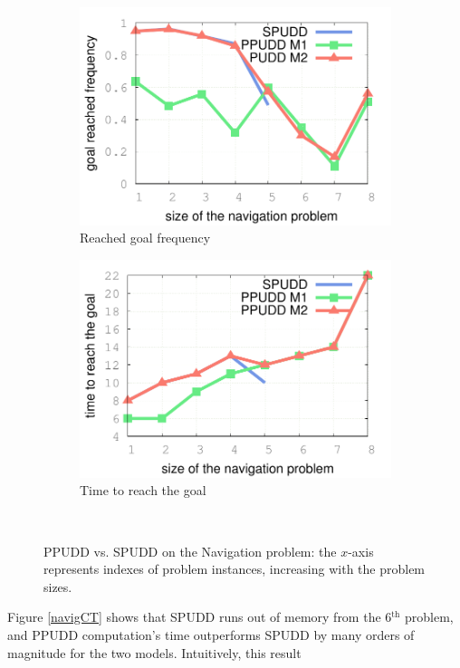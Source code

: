 \begin{figure}
\begin{subfigure}[b]{.48\linewidth}
\includegraphics[width=\linewidth]{courbePerfMDP.pdf}
\caption{Reached goal frequency}
\label{navigGOAL}
\end{subfigure}
\begin{subfigure}[b]{.48\linewidth}
\includegraphics[width=\linewidth]{courbePerfMDP2.pdf}
\caption{Time to reach the goal}
\label{navigL}
\end{subfigure}\\
\vspace{0.5cm}
\caption[PPUDD vs. SPUDD, Navigation problem]{PPUDD vs. SPUDD on the Navigation problem: the $x$-axis represents indexes of problem instances, increasing with the problem sizes.}
\end{figure}
Figure \ref{navigCT} shows that 
SPUDD runs out of memory from the 6$^{\text{th}}$ problem, and PPUDD computation's time
outperforms SPUDD by many orders of magnitude for the two models. Intuitively, this result
